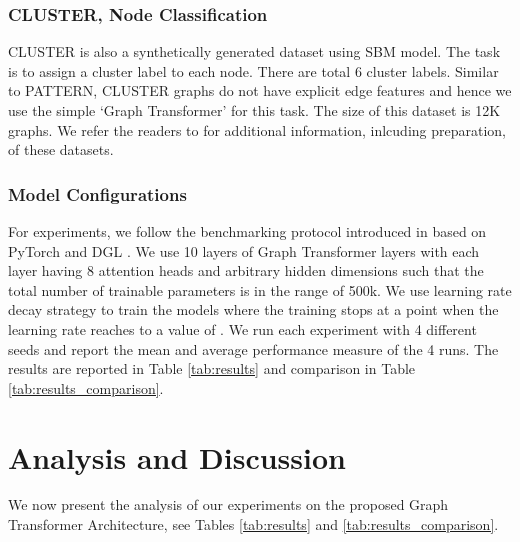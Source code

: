 \documentclass[letterpaper]{article} \usepackage{aaai21}  \usepackage{times}  \usepackage{helvet} \usepackage{courier}  \usepackage[hyphens]{url}  \usepackage{graphicx} \urlstyle{rm} \def\UrlFont{\rm}  \usepackage{natbib}  \usepackage{caption} \usepackage{xcolor}
\begin{document}
\subsubsection{CLUSTER, Node Classification}
CLUSTER is also a synthetically generated dataset using SBM model. The task is to assign a cluster label to each node. There are total 6 cluster labels. Similar to PATTERN, CLUSTER graphs do not have explicit edge features and hence we use the simple `Graph Transformer' for this task. The size of this dataset is 12K graphs. We refer the readers to \cite{dwivedi2020benchmarking} for additional information, inlcuding preparation, of these datasets.

\subsubsection{Model Configurations}
For experiments, we follow the benchmarking protocol introduced in \citet{dwivedi2020benchmarking} based on PyTorch \cite{paszke2019pytorch} and DGL \cite {wang2019dgl}. We use 10 layers of Graph Transformer layers with each layer having 8 attention heads and arbitrary hidden dimensions such that the total number of trainable parameters is in the range of 500k. We use learning rate decay strategy to train the models where the training stops at a point when the learning rate reaches to a value of . 
We run each experiment with 4 different seeds and report the mean and average performance measure of the 4 runs. 
The results are reported in Table \ref{tab:results} and comparison in Table \ref{tab:results_comparison}.




\section{Analysis and Discussion}
We now present the analysis of  our experiments on the proposed Graph Transformer Architecture,
see Tables \ref{tab:results} and \ref{tab:results_comparison}.
\end{document}
